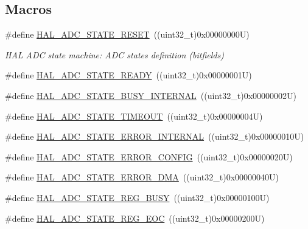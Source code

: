 \subsection*{Macros}
\begin{DoxyCompactItemize}
\item 
\#define \mbox{\hyperlink{group___a_d_c___exported___types_ga3f995b6dedd7366d0663f852511b9104}{H\+A\+L\+\_\+\+A\+D\+C\+\_\+\+S\+T\+A\+T\+E\+\_\+\+R\+E\+S\+ET}}~((uint32\+\_\+t)0x00000000\+U)
\begin{DoxyCompactList}\small\item\em H\+AL A\+DC state machine\+: A\+DC states definition (bitfields) \end{DoxyCompactList}\item 
\#define \mbox{\hyperlink{group___a_d_c___exported___types_gadccf2475d321f82bc5b18b4c0031794b}{H\+A\+L\+\_\+\+A\+D\+C\+\_\+\+S\+T\+A\+T\+E\+\_\+\+R\+E\+A\+DY}}~((uint32\+\_\+t)0x00000001\+U)
\item 
\#define \mbox{\hyperlink{group___a_d_c___exported___types_ga7055248355e179ee208d23bd2ce8ba69}{H\+A\+L\+\_\+\+A\+D\+C\+\_\+\+S\+T\+A\+T\+E\+\_\+\+B\+U\+S\+Y\+\_\+\+I\+N\+T\+E\+R\+N\+AL}}~((uint32\+\_\+t)0x00000002\+U)
\item 
\#define \mbox{\hyperlink{group___a_d_c___exported___types_gaaa31ad8c2f5337eac601534cb581dd15}{H\+A\+L\+\_\+\+A\+D\+C\+\_\+\+S\+T\+A\+T\+E\+\_\+\+T\+I\+M\+E\+O\+UT}}~((uint32\+\_\+t)0x00000004\+U)
\item 
\#define \mbox{\hyperlink{group___a_d_c___exported___types_ga65b592627f1f9277f4b89bfc33a9e641}{H\+A\+L\+\_\+\+A\+D\+C\+\_\+\+S\+T\+A\+T\+E\+\_\+\+E\+R\+R\+O\+R\+\_\+\+I\+N\+T\+E\+R\+N\+AL}}~((uint32\+\_\+t)0x00000010\+U)
\item 
\#define \mbox{\hyperlink{group___a_d_c___exported___types_ga22d43a637ce63e13e33f5a0f1d4564fd}{H\+A\+L\+\_\+\+A\+D\+C\+\_\+\+S\+T\+A\+T\+E\+\_\+\+E\+R\+R\+O\+R\+\_\+\+C\+O\+N\+F\+IG}}~((uint32\+\_\+t)0x00000020\+U)
\item 
\#define \mbox{\hyperlink{group___a_d_c___exported___types_ga5a1b4881d17e72aa0823797958221172}{H\+A\+L\+\_\+\+A\+D\+C\+\_\+\+S\+T\+A\+T\+E\+\_\+\+E\+R\+R\+O\+R\+\_\+\+D\+MA}}~((uint32\+\_\+t)0x00000040\+U)
\item 
\#define \mbox{\hyperlink{group___a_d_c___exported___types_ga516d4b4ebc261c241c69d96aae19acc3}{H\+A\+L\+\_\+\+A\+D\+C\+\_\+\+S\+T\+A\+T\+E\+\_\+\+R\+E\+G\+\_\+\+B\+U\+SY}}~((uint32\+\_\+t)0x00000100\+U)
\item 
\#define \mbox{\hyperlink{group___a_d_c___exported___types_gae2da191bffb720a553a1e39c10929711}{H\+A\+L\+\_\+\+A\+D\+C\+\_\+\+S\+T\+A\+T\+E\+\_\+\+R\+E\+G\+\_\+\+E\+OC}}~((uint32\+\_\+t)0x00000200\+U)

\end{DoxyCompactItemize}
